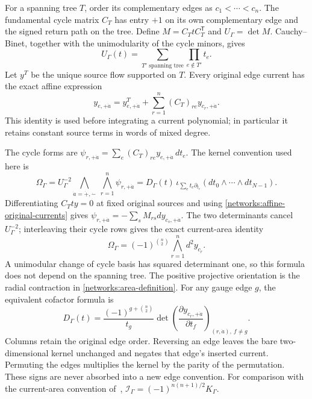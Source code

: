 For a spanning tree $T$, order its complementary edges as
$c_1<\cdots<c_n$.  The fundamental cycle matrix $C_T$ has entry $+1$ on
its own complementary edge and the signed return path on the tree.
Define $M=C_TtC_T^{\mathsf T}$ and $U_\Gamma=\det M$.  Cauchy--Binet,
together with the unimodularity of the cycle minors, gives
\begin{equation}
 U_\Gamma(t)=\sum_{T'\text{ spanning tree}}
                  \prod_{e\notin T'}t_e.
 \label{networks:kirchhoff-polynomial}
\end{equation}
Let $y^T$ be the unique source flow supported on $T$.  Every original edge
current has the exact affine expression
\begin{equation}
 y_{e,+\dot a}=y^T_{e,+\dot a}
       +\sum_{r=1}^n(C_T)_{re}y_{c_r,+\dot a}.
 \label{networks:affine-original-currents}
\end{equation}
This identity is used before integrating a current polynomial; in
particular it retains constant source terms in words of mixed degree.

The cycle forms are
$\psi_{r,+\dot a}=\sum_e(C_T)_{re}y_{e,+\dot a}\,dt_e$.
The kernel convention used here is
\begin{equation}
 \Omega_\Gamma=U_\Gamma^{-2}
       \bigwedge_{\dot a=\dot+,\dot-}\ \bigwedge_{r=1}^n\psi_{r,+\dot a}
       =D_\Gamma(t)\,\iota_{\sum_e t_e\partial_{t_e}}
                          (dt_0\wedge\cdots\wedge dt_{N-1}).
 \label{networks:area-definition}
\end{equation}
Differentiating $C_Tty=0$ at fixed original sources and using
\eqref{networks:affine-original-currents} gives
$\psi_{r,+\dot a}=-\sum_sM_{rs}dy_{c_s,+\dot a}$.
The two determinants cancel $U_\Gamma^{-2}$; interleaving their cycle rows
gives the exact current-area identity
\begin{equation}
 \boxed{\Omega_\Gamma=(-1)^{\binom n2}
              \bigwedge_{r=1}^n d^2y_{c_r}.}
 \label{networks:current-area}
\end{equation}
A unimodular change of cycle basis has squared determinant one, so this
formula does not depend on the spanning tree.  The positive projective
orientation is the radial contraction in
\eqref{networks:area-definition}.  For any gauge edge $g$, the equivalent
cofactor formula is
\begin{equation}
 D_\Gamma(t)=\frac{(-1)^{g+\binom n2}}{t_g}
 \det\left(\frac{\partial y_{c_r,+\dot a}}{\partial t_f}\right)
 _{(r,\dot a),\ f\ne g}.
 \label{networks:density-cofactor}
\end{equation}
Columns retain the original edge order.  Reversing an edge leaves the
bare two-dimensional kernel unchanged and negates that edge's inserted
current.  Permuting the edges multiplies the kernel by the parity of the
permutation.  These signs are never absorbed into a new edge convention.
For comparison with the current-area convention of~\cite{li2026},
$\mathcal I_\Gamma=(-1)^{n(n+1)/2}K_\Gamma$.

